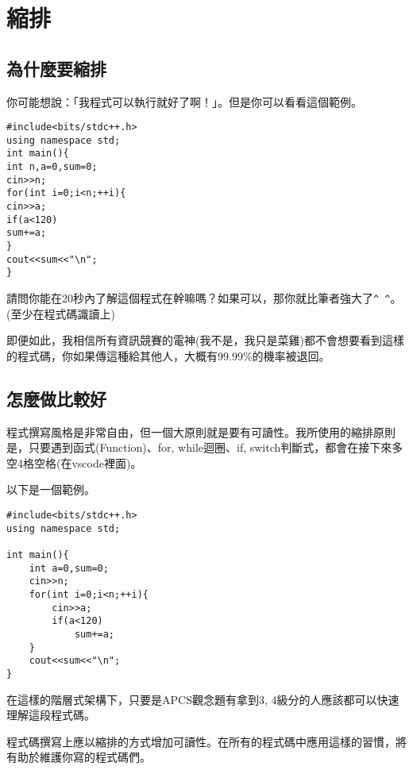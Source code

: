 \section{縮排}
    \subsection{為什麼要縮排}
    你可能想說：「我程式可以執行就好了啊！」。但是你可以看看這個範例。

    \begin{lstlisting}[caption=縮排的錯誤示範]
#include<bits/stdc++.h>
using namespace std;
int main(){
int n,a=0,sum=0;
cin>>n;
for(int i=0;i<n;++i){
cin>>a;
if(a<120)
sum+=a;
}
cout<<sum<<"\n";
}\end{lstlisting}

    請問你能在20秒內了解這個程式在幹嘛嗎？如果可以，那你就比筆者強大了\verb|^ ^|。(至少在程式碼識讀上)

    即便如此，我相信所有資訊競賽的電神(我不是，我只是菜雞)都不會想要看到這樣的程式碼，你如果傳這種給其他人，大概有99.99\%的機率被退回。

    \subsection{怎麼做比較好}
    程式撰寫風格是非常自由，但一個大原則就是要有可讀性。我所使用的縮排原則是，只要遇到函式(Function)、for, while迴圈、if, switch判斷式，都會在接下來多空4格空格(在vscode裡面)。
    
    以下是一個範例。

    \begin{lstlisting}[caption=縮排的合理示例]
#include<bits/stdc++.h>
using namespace std;

int main(){
    int a=0,sum=0;
    cin>>n;
    for(int i=0;i<n;++i){
        cin>>a;
        if(a<120)
            sum+=a;
    }
    cout<<sum<<"\n";
}\end{lstlisting}

    在這樣的階層式架構下，只要是APCS觀念題有拿到3, 4級分的人應該都可以快速理解這段程式碼。

    \begin{tip}
    程式碼撰寫上應以縮排的方式增加可讀性。在所有的程式碼中應用這樣的習慣，將有助於維護你寫的程式碼們。
    \end{tip}
